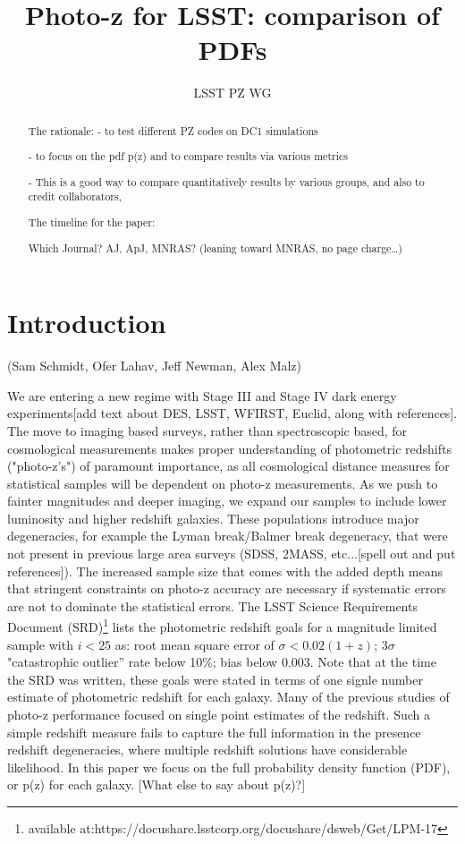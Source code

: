 \documentclass[usenatbib]{mn2e}
\title{Photo-z for LSST: comparison of PDFs}
\author{LSST PZ WG}
\begin{document}
\maketitle

\begin{abstract}
The rationale: - to test different PZ codes on DC1 simulations 

- to focus on the pdf p(z) and to compare results via various metrics

- This is a good way to compare quantitatively results by various groups, and also to credit collaborators, 

The timeline for the paper:

Which Journal? AJ, ApJ, MNRAS? (leaning toward MNRAS, no page charge…) 

\end{abstract}

\section{Introduction}

(Sam Schmidt, Ofer Lahav, Jeff Newman, Alex Malz)

We are entering a new regime with Stage III and Stage IV dark energy experiments[add text about DES, LSST, WFIRST, Euclid, along with references].  The move to imaging based surveys, rather than spectroscopic based, for cosmological measurements makes proper understanding of photometric redshifts ("photo-z's") of paramount importance, as all cosmological distance measures for statistical samples will be dependent on photo-z measurements.  As we push to fainter magnitudes and deeper imaging, we expand our samples to include lower luminosity and higher redshift galaxies.  These populations introduce major degeneracies, for example the Lyman break/Balmer break degeneracy, that were not present in previous large area surveys (SDSS, 2MASS, etc...[spell out and put references]).  The increased sample size that comes with the added depth means that stringent constraints on photo-z accuracy are necessary if systematic errors are not to dominate the statistical errors.  The LSST Science Requirements Document (SRD)\footnote{available at:https://docushare.lsstcorp.org/docushare/dsweb/Get/LPM-17} lists the photometric redshift goals for a magnitude limited sample with $i<25$ as: root mean square error of $\sigma<0.02(1+z)$; $3\sigma$ "catastrophic outlier'' rate below 10\%; bias below 0.003.  Note that at the time the SRD was written, these goals were stated in terms of one signle number estimate of photometric redshift for each galaxy.  Many of the previous studies of photo-z performance focused on single point estimates of the redshift.  Such a simple redshift measure fails to capture the full information in the presence redshift degeneracies, where multiple redshift solutions have considerable likelihood.  In this paper we focus on the full probability density function (PDF), or p(z) for each galaxy.  [What else to say about p(z)?]
\end{document}

